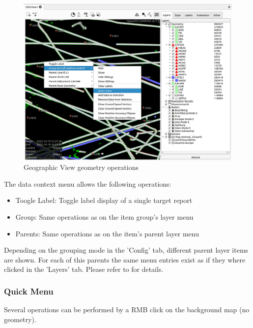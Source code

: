 \begin{figure}[H]
    \hspace*{-2.5cm}
    \includegraphics[width=19cm,frame]{figures/geoview_data_operations.png}
  \caption{Geographic View geometry operations}
\end{figure}

The data context menu allows the following operations:

\begin{itemize}
 \item Toogle Label: Toggle label display of a single target report
 \item Group: Same operations as on the item group's layer menu
 \item Parents: Same operations as on the item's parent layer menu
\end{itemize}

Depending on the grouping mode in the 'Config' tab, different parent layer items are shown. For each of this parents the same menu entries exist as if they where clicked in the 'Layers' tab. Please refer to  for details.


\subsubsection{Quick Menu}

Several operations can be performed by a RMB click on the background map (no geometry).

